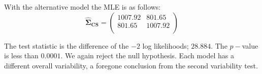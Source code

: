 \documentclass[12pt, a4paper]{report}
\theoremstyle{plain}
\theoremstyle{definition}
\theoremstyle{remark}
\begin{document}
With the alternative model the MLE is as follows:
\begin{equation}
\boldsymbol{\hat{\Sigma}_{CS}} = \left( \begin{array}{cc}
1007.92  & 801.65  \\
801.65  & 1007.92  \\
\end{array}\right)
\end{equation}


The test statistic is the difference of the $-2$ log likelihoods; $28.884$. The $p-$value is less than $0.0001$. We again reject the null hypothesis. Each model has a different overall variability, a foregone conclusion from the second variability test.




\end{document}
